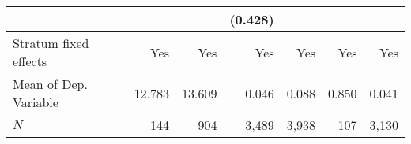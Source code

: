 \begin{tabular}{lrrrrrr}
                                  &         &                           &                                              (0.428) &                                               &                                                     &                                                     \\ 
\midrule
Stratum fixed effects             &     Yes &                       Yes &                                                  Yes &                                           Yes &                                                 Yes &                                                 Yes \\ 
Mean of Dep. Variable             &  12.783 &                    13.609 &                                                0.046 &                                         0.088 &                                               0.850 &                                               0.041 \\ 
$N$                               &     144 &                       904 &                                                3,489 &                                         3,938 &                                                 107 &                                               3,130 \\ 
\bottomrule
\end{tabular}
